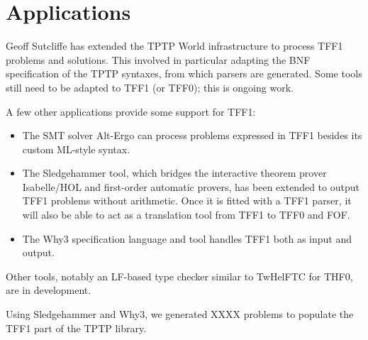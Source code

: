 \section{Applications}
\label{sec_apps}

Geoff Sutcliffe has extended the TPTP World infrastructure to process TFF1
problems and solutions. This involved in particular adapting the BNF
specification of the TPTP syntaxes, from which parsers are generated. Some tools
still need to be adapted to TFF1 (or TFF0); this is ongoing work.

A few other applications provide some support for TFF1:
%
\begin{itemize}
\item The SMT solver Alt-Ergo can process problems expressed in TFF1 besides its
custom ML-style syntax.

\item The Sledgehammer tool, which bridges the interactive theorem prover
Isabelle\slash HOL and first-order automatic provers, has been extended to
output TFF1 problems without arithmetic. Once it is fitted with a TFF1 parser,
it will also be able to act as a translation tool from TFF1 to TFF0 and FOF.

\item The Why3 specification language and tool handles TFF1 both as input and
output.
\end{itemize}

Other tools, notably an LF-based type checker similar to TwHelFTC for THF0,
are in development.

Using Sledgehammer and Why3, we generated XXXX problems to populate the TFF1
part of the TPTP library.

%
%
%
%

